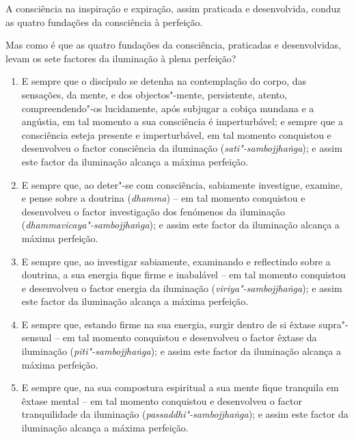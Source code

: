 A consciência na inspiração e expiração, assim praticada e desenvolvida, conduz
as quatro fundações da consciência à perfeição.

Mas como é que as quatro fundações da consciência, praticadas e desenvolvidas,
levam os sete factores da iluminação à plena perfeição?

\begin{enumerate}

  \item E sempre que o discípulo se detenha na contemplação do corpo, das
        sensações, da mente, e dos objectos"-mente, persistente, atento,
        compreendendo"-os lucidamente, após subjugar a cobiça mundana e a
        angústia, em tal momento a sua consciência é imperturbável; e sempre que
        a consciência esteja presente e imperturbável, em tal momento conquistou
        e desenvolveu o factor consciência da iluminação
        (\emph{sati"-sambojjhaṅga}); e assim este factor da iluminação alcança a
        máxima perfeição.

  \item E sempre que, ao deter"-se com consciência, sabiamente investigue,
        examine, e pense sobre a doutrina (\emph{dhamma}) -- em tal momento
        conquistou e desenvolveu o factor investigação dos fenómenos da
        iluminação (\emph{dhammavicaya"-sambojjhaṅga}); e assim este factor da
        iluminação alcança a máxima perfeição.

  \item E sempre que, ao investigar sabiamente, examinando e reflectindo sobre a
        doutrina, a sua energia fique firme e inabalável -- em tal momento
        conquistou e desenvolveu o factor energia da iluminação
        (\emph{viriya"-sambojjhaṅga}); e assim este factor da iluminação alcança
        a máxima perfeição.

  \item E sempre que, estando firme na sua energia, surgir dentro de si êxtase
        supra"-sensual -- em tal momento conquistou e desenvolveu o factor êxtase
        da iluminação (\emph{pīti"-sambojjhaṅga}); e assim este factor da
        iluminação alcança a máxima perfeição.

  \item E sempre que, na sua compostura espiritual a sua mente fique tranquila
        em êxtase mental -- em tal momento conquistou e desenvolveu o factor
        tranquilidade da iluminação (\emph{passaddhi"-sambojjhaṅga}); e assim
        este factor da iluminação alcança a máxima perfeição.


\end{enumerate}
